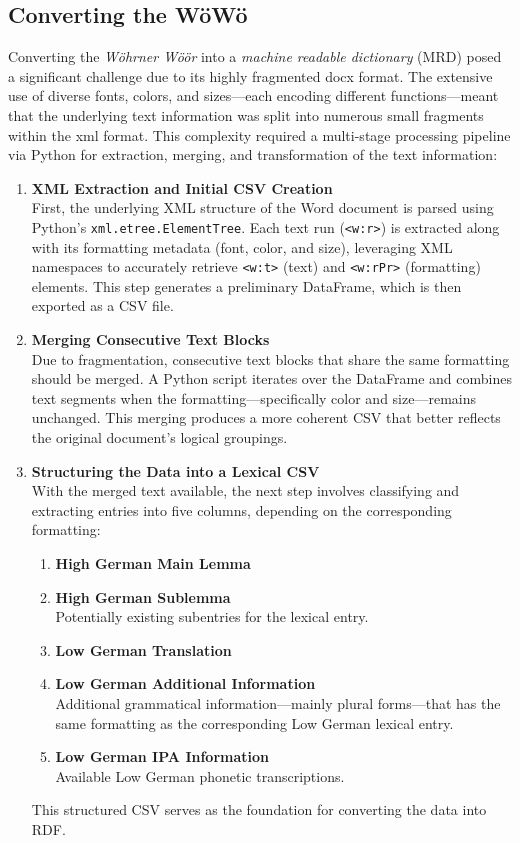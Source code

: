 \subsection{Converting the WöWö}

Converting the \emph{Wöhrner Wöör} into a \emph{machine readable dictionary} (MRD) posed a significant challenge due to its highly fragmented docx format. The extensive use of diverse fonts, colors, and sizes—each encoding different functions—meant that the underlying text information was split into numerous small fragments within the xml format. This complexity required a multi-stage processing pipeline via Python for extraction, merging, and transformation of the text information:

\begin{enumerate}
    \item \textsf{\textbf{XML Extraction and Initial CSV Creation}}\\  
    First, the underlying XML structure of the Word document is parsed using Python’s \texttt{xml.etree.ElementTree}. Each text run (\texttt{<w:r>}) is extracted along with its formatting metadata (font, color, and size), leveraging XML namespaces to accurately retrieve \texttt{<w:t>} (text) and \texttt{<w:rPr>} (formatting) elements. This step generates a preliminary DataFrame, which is then exported as a CSV file.

    \item \textsf{\textbf{Merging Consecutive Text Blocks}}\\  
    Due to fragmentation, consecutive text blocks that share the same formatting should be merged. A Python script iterates over the DataFrame and combines text segments when the formatting—specifically color and size—remains unchanged. This merging produces a more coherent CSV that better reflects the original document’s logical groupings.

    \item \textsf{\textbf{Structuring the Data into a Lexical CSV}}\\  
    With the merged text available, the next step involves classifying and extracting entries into five columns, depending on the corresponding formatting:
    \begin{enumerate}
        \item {\textbf{High German Main Lemma}}
        \item {\textbf{High German Sublemma}}\\Potentially existing subentries for the lexical entry.
        \item {\textbf{Low German Translation}}
        \item {\textbf{Low German Additional Information}}\\ Additional grammatical information—mainly plural forms—that has the same formatting as the corresponding Low German lexical entry.
        \item {\textbf{Low German IPA Information}}\\Available Low German phonetic transcriptions.
    \end{enumerate}
    This structured CSV serves as the foundation for converting the data into RDF.


\end{enumerate}
